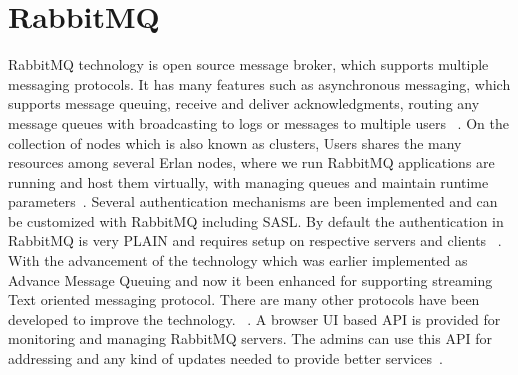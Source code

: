 \section{RabbitMQ}

RabbitMQ technology is open source message broker, which supports multiple 
messaging protocols. It has many features such as asynchronous messaging, 
which supports message queuing, receive and deliver acknowledgments, routing 
any message queues with broadcasting to logs or messages to multiple users
~\cite{hid-sp18-520-RabbitMQ}.
On the collection of nodes which is also known as clusters, Users shares the 
many resources among several Erlan nodes, where we run RabbitMQ applications 
are running and host them virtually, with managing queues and maintain 
runtime parameters~\cite{hid-sp18-520-RabbitMQCluster}.
Several authentication mechanisms are been implemented and can be customized 
with RabbitMQ including SASL. By default the authentication in RabbitMQ is 
very PLAIN and requires setup on respective servers and clients
~\cite{hid-sp18-520-RabbitMQauth}.
With the advancement of the technology which was earlier implemented as 
Advance Message Queuing and now it been enhanced for supporting 
streaming Text oriented messaging protocol. There are many other protocols 
have been developed to improve the technology.
~\cite{hid-sp18-520-RabbitMQwiki}.
A browser UI based API is provided for monitoring and managing RabbitMQ 
servers. The admins can use this API for addressing and any kind of updates 
needed to provide better services~\cite{hid-sp18-520-RabbitMQmana}.
